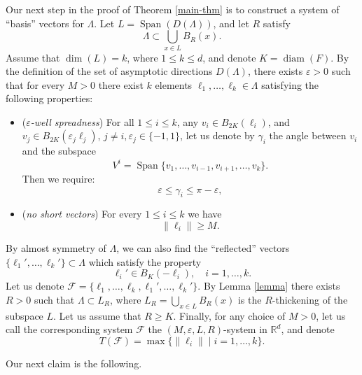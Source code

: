 \documentclass[10pt]{amsart}
\DeclareMathOperator{\diam}{diam}
\DeclareMathOperator{\Span}{Span}
\newcommand{\cF}{\mathcal{F}}
\newcommand{\bR}{\mathbb{R}}
\let\eps\varepsilon
\theoremstyle{plain}
\theoremstyle{definition}
\begin{document}
Our next step in the proof of Theorem \ref{main-thm} is to construct a system of ``basis'' vectors for $\Lambda$. Let $L = \Span(D(\Lambda))$, and let $R$ satisfy
\begin{equation}\label{R-thick}
\Lambda \subset \bigcup_{x \in L} B_{R}(x).
\end{equation}
Assume that $\dim(L) = k$, where $1 \le k \le d$, and denote $K = \diam(F)$. By the definition of the set of asymptotic directions $D(\Lambda)$, there exists $\eps > 0$ such that for every $M > 0$ there exist $k$ elements $\ell_1,\ldots,\ell_k \in \Lambda$ satisfying the following properties:

\begin{itemize}
\item{(\textit{$\eps$-well spreadness})}
For all $1 \le i \le k$, any $v_i \in B_{2K}(\ell_i)$, and $v_j \in B_{2K}(\varepsilon_j\ell_j)$, $j \neq i, \varepsilon_j \in \{-1,1\}$, let us denote by $\gamma_i$ the angle between $v_i$ and the subspace
\[
V^i = \Span\{v_1,\ldots,v_{i-1},v_{i+1},\ldots,v_k\}.
\]
Then we require:
\[
\eps \le \gamma_i \le \pi - \eps,
\]

\item{(\textit{no short vectors})} For every $1 \le i \le k$ we have
\[
\| \ell_i \| \ge M.
\]
\end{itemize}
By almost symmetry of $\Lambda$, we can also find the ``reflected'' vectors $\{\ell_1',\ldots,\ell_k'\} \subset \Lambda$ which satisfy the property
\[
\ell_i' \in B_K(-\ell_i),\quad i=1,\ldots,k.
\]
Let us denote $\cF = \{\ell_1,\ldots,\ell_k, \ell_1',\ldots,\ell_k'\}$. By Lemma \ref{lemma} there exists $R > 0$ such that $\Lambda \subset L_R$, where
$L_R = \bigcup_{x \in L} B_R(x)$ is the $R$-thickening of the subspace $L$. Let us assume that $R \ge K$.
Finally, for any choice of $M > 0$, let us call the corresponding system $\cF$ the $(M,\eps,L,R)$-system in $\bR^d$, and denote $$T(\cF) = \max\{ \| \ell_i \| \mid i=1,\ldots,k \}.$$

Our next claim is the following.
\end{document}
